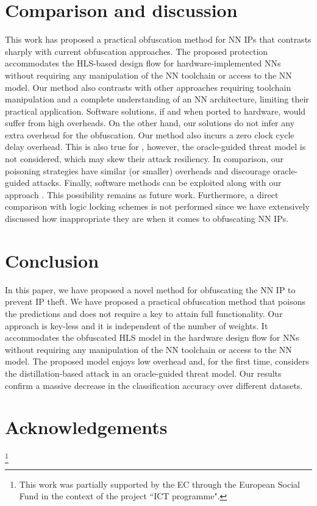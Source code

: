 \documentclass[10pt, twocolumn, conference]{IEEEtran}
\begin{document}
\section{Comparison and discussion} \label{sec:comparison_discussion}
This work has proposed a practical obfuscation method for NN IPs that contrasts sharply with current obfuscation approaches. The proposed protection accommodates the HLS-based design flow for hardware-implemented NNs without requiring any manipulation of the NN toolchain or access to the NN model. Our method also contrasts with other approaches requiring toolchain manipulation and a complete understanding of an NN architecture, limiting their practical application. Software solutions, if and when ported to hardware, would suffer from high overheads. On the other hand, our solutions do not infer any extra overhead for the obfuscation. Our method also incurs a zero clock cycle delay overhead. This is also true for \cite{rfHwAssDate}, however, the oracle-guided threat model is not considered, which may skew their attack resiliency. In comparison, our poisoning strategies have similar (or smaller) overheads and discourage oracle-guided attacks. Finally, software methods can be exploited along with our approach \cite{rfPrdPsn,rfrvrsgmd}. This possibility remains as future work. Furthermore, a direct comparison with logic locking schemes is not performed since we have extensively discussed how inappropriate they are when it comes to obfuscating NN IPs.


\section{Conclusion}
In this paper, we have proposed a novel method for obfuscating the NN IP to prevent IP theft. We have proposed a practical obfuscation method that poisons the predictions and does not require a key to attain full functionality. Our approach is key-less and it is independent of the number of weights. It accommodates the obfuscated HLS model in the hardware design flow for NNs without requiring any manipulation of the NN toolchain or access to the NN model. The proposed model enjoys low overhead and, for the first time, considers the distillation-based attack in an oracle-guided threat model. Our results confirm a massive decrease in the classification accuracy over different datasets. 

\section{Acknowledgements}
\thanks{This work was partially supported by the EC through the European Social Fund in the context of the project ``ICT programme".}



\end{document}
